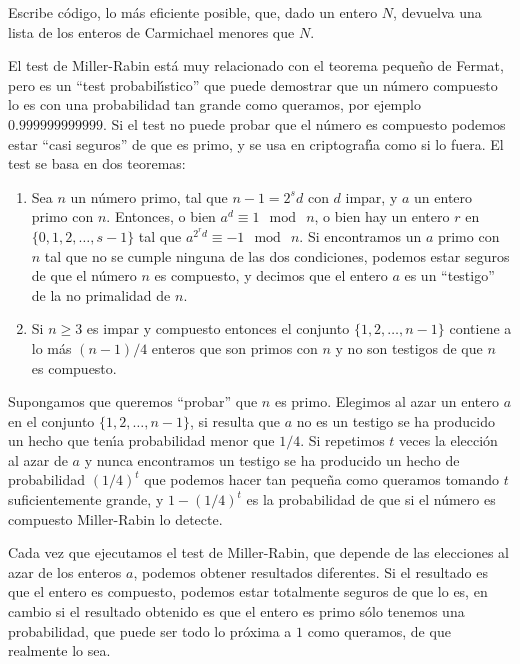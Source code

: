 \begin{ejer}
Escribe c\'odigo, lo m\'as eficiente posible,  que, dado un
entero $N$,  devuelva una lista
de los enteros de Carmichael menores que $N$.
\end{ejer}



El test de Miller-Rabin est\'a muy relacionado con el teorema peque\~no de
Fermat, pero es un  ``test probabil\'{\i}stico'' que puede demostrar que un
n\'umero compuesto lo es con una probabilidad tan grande como queramos, 
por ejemplo $0{.}999999999999$. Si el test  no puede probar que el n\'umero es
compuesto podemos estar ``casi seguros'' de que es primo, y se usa
en criptograf\'{\i}a como si lo fuera. El test se basa en dos teoremas:

{\itshape

\begin{enumerate}\renewcommand{\labelenumi}{{\upshape\theenumi.}}
 \item Sea $n$ un n\'umero primo, tal que $n-1=2^sd$ con $d$ impar, y $a$ un
entero primo con $n$. Entonces, o bien $a^d\equiv 1 \mod\  n$, o bien
 hay un entero $r$  en $\{0,1,2,\dots,s-1\}$ tal que  $a^{2^rd}\equiv -1 \mod\ 
n$. Si encontramos un $a$ primo con $n$ tal que no se cumple ninguna de las dos
condiciones, 
 podemos estar seguros de que el n\'umero $n$ es compuesto, y decimos que  el
entero  $a$ es un
``testigo'' de la no primalidad de $n$.
 \item Si $n\ge 3$ es impar y compuesto entonces el conjunto $\{1,2,\dots,n-1\}$
contiene a lo m\'as $(n-1)/4$ enteros que son primos con $n$ y no son testigos
de que $n$ es compuesto.
 \end{enumerate}
}

Supongamos que queremos ``probar'' que $n$ es primo. Elegimos al azar un entero
$a$ en el conjunto  $\{1,2,\dots,n-1\}$, si resulta que $a$ no es un testigo se
ha producido un hecho 
que ten\'{\i}a probabilidad menor que $1/4$. Si repetimos $t$ veces la
elecci\'on al azar de $a$ y nunca encontramos un testigo se ha producido un
hecho de probabilidad $(1/4)^t$ que 
podemos hacer tan peque\~na como queramos tomando $t$ suficientemente grande, y
$1-(1/4)^t$ es la probabilidad de que si el n\'umero es compuesto Miller-Rabin
lo detecte.  

Cada vez que ejecutamos el test de Miller-Rabin, que depende de las elecciones al azar de los enteros $a$, podemos obtener resultados diferentes. Si el resultado es que el entero es compuesto, podemos estar totalmente seguros de que lo es, en cambio si el resultado obtenido es que el entero  es primo s\'olo tenemos una probabilidad, que puede ser todo lo pr\'oxima a $1$ como queramos, de que realmente lo sea.  

